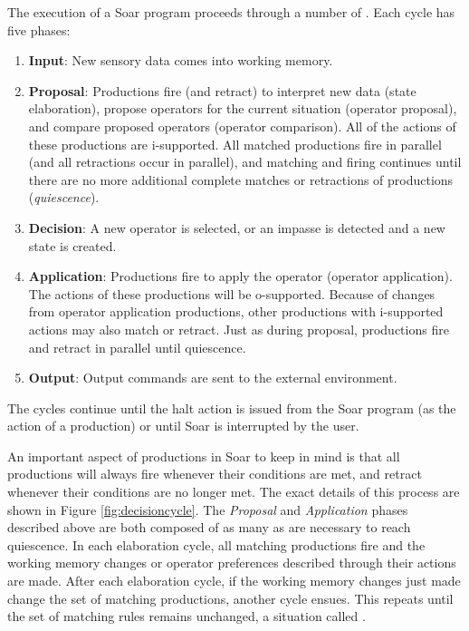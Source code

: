 The execution of a Soar program proceeds through a number of . Each cycle has five phases:

\begin{enumerate} 
	\item \textbf{Input}: 
		New sensory data comes into working memory.
	\item \textbf{Proposal}: 
		Productions fire (and retract) to interpret new data (state elaboration), propose operators for the current situation (operator proposal), and compare proposed operators (operator comparison).  All of the actions of these productions are i-supported.  All matched productions fire in parallel (and all retractions occur in parallel), and matching and firing continues until there are no more additional complete matches or retractions of productions (\emph{quiescence}). 
	\item \textbf{Decision}:
		A new operator is selected, or an impasse is detected and a new state is created.
	\item \textbf{Application}: 
		Productions fire to apply the operator (operator application).  The actions of these productions will be o-supported. Because of changes from operator application productions, other productions with i-supported actions may also match or retract. Just as during proposal, productions fire and retract in parallel until quiescence.
	\item \textbf{Output}: 
		Output commands are sent to the external environment.
\end{enumerate}

The cycles continue until the halt action is issued from the Soar program (as the action of a production) or until Soar is interrupted by the user.

An important aspect of productions in Soar to keep in mind is that all productions will always fire whenever their conditions are met, and retract whenever their conditions are no longer met. The exact details of this process are shown in Figure \ref{fig:decisioncycle}. The \emph{Proposal} and \emph{Application} phases described above are both composed of as many  as are necessary to reach quiescence. In each elaboration cycle, all matching productions fire and the working memory changes or operator preferences described through their actions are made. After each elaboration cycle, if the working memory changes just made change the set of matching productions, another cycle ensues. This repeats until the set of matching rules remains unchanged, a situation called .


